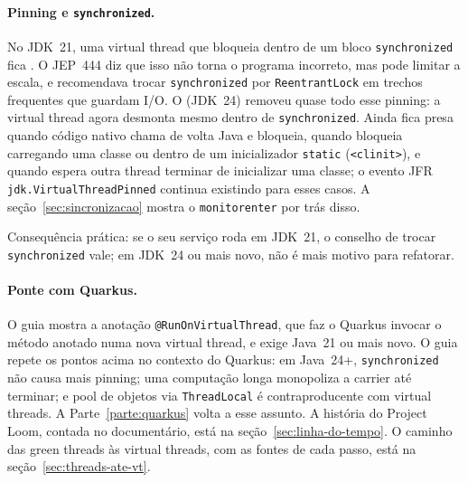 \paragraph{Pinning e \texttt{synchronized}.}
No JDK~21, uma virtual thread que bloqueia dentro de um bloco
\texttt{synchronized} fica . O
JEP~444 diz que isso não torna o programa incorreto, mas pode limitar a
escala, e recomendava trocar \texttt{synchronized} por
\texttt{ReentrantLock} em trechos frequentes que guardam I/O. O
 (JDK~24) removeu quase todo esse pinning: a
virtual thread agora desmonta mesmo dentro de \texttt{synchronized}. Ainda
fica presa quando código nativo chama de volta Java e bloqueia, quando
bloqueia carregando uma classe ou dentro de um inicializador
\texttt{static} (\texttt{<clinit>}), e quando espera outra thread terminar
de inicializar uma classe; o evento JFR \texttt{jdk.VirtualThreadPinned} continua existindo para esses
casos. A seção~\ref{sec:sincronizacao} mostra o
\texttt{monitorenter} por trás disso.

Consequência prática: se o seu serviço roda em JDK~21, o conselho de
trocar \texttt{synchronized} vale; em JDK~24 ou mais novo, não é mais
motivo para refatorar.

\paragraph{Ponte com Quarkus.}
O guia  mostra a anotação
\texttt{@RunOnVirtualThread}, que faz o Quarkus invocar o método anotado
numa nova virtual thread, e exige Java~21 ou mais novo. O guia repete os
pontos acima no contexto do Quarkus: em Java~24+, \texttt{synchronized}
não causa mais pinning; uma computação longa monopoliza a carrier até
terminar; e pool de objetos via \texttt{ThreadLocal} é contraproducente
com virtual threads. A Parte~\ref{parte:quarkus} volta a esse assunto. A história do
Project Loom, contada no documentário, está na
seção~\ref{sec:linha-do-tempo}.
O caminho das green threads às virtual threads, com as fontes de cada
passo, está na seção~\ref{sec:threads-ate-vt}.
